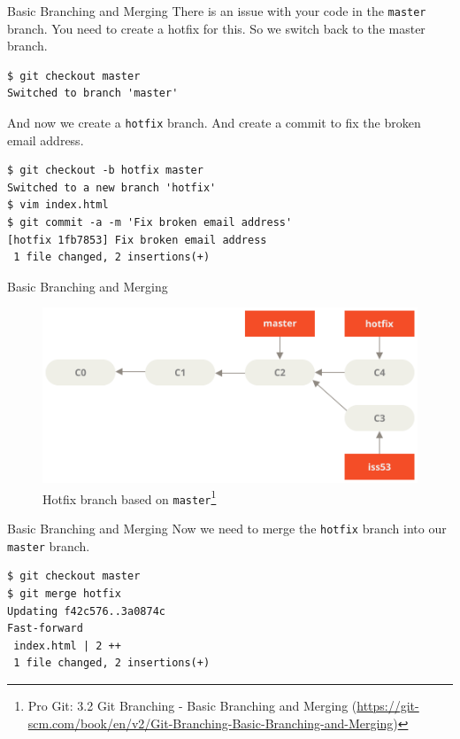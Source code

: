 \documentclass[aspectratio=169]{beamer}
\renewcommand{\footnotesize}{\tiny}
\newcommand{\sectiontitle}{}
\begin{document}
\begin{frame}[fragile]{Basic Branching and Merging}{\sectiontitle}
There is an issue with your code in the \texttt{master} branch. You need to
create a hotfix for this. So we switch back to the master branch.
\begin{verbatim}
$ git checkout master
Switched to branch 'master'
\end{verbatim}
And now we create a \texttt{hotfix} branch. And create a commit to fix the broken
email address.
\begin{verbatim}
$ git checkout -b hotfix master
Switched to a new branch 'hotfix'
$ vim index.html
$ git commit -a -m 'Fix broken email address'
[hotfix 1fb7853] Fix broken email address
 1 file changed, 2 insertions(+)
\end{verbatim}
\end{frame}

\begin{frame}[fragile]{Basic Branching and Merging}{\sectiontitle}
\begin{figure}
    \centering
    \includegraphics[width=\textwidth,height=0.5\textheight,keepaspectratio]{basic-branching-4}
    \caption{
        Hotfix branch based on \texttt{master}\footnote{
            Pro Git: 3.2 Git Branching - Basic Branching and Merging
            (\url{https://git-scm.com/book/en/v2/Git-Branching-Basic-Branching-and-Merging})
        }
    }
\end{figure}
\end{frame}

\begin{frame}[fragile]{Basic Branching and Merging}{\sectiontitle}
Now we need to merge the \texttt{hotfix} branch into our \texttt{master} branch.
\begin{verbatim}
$ git checkout master
$ git merge hotfix
Updating f42c576..3a0874c
Fast-forward
 index.html | 2 ++
 1 file changed, 2 insertions(+)
\end{verbatim}
\end{frame}
\end{document}
